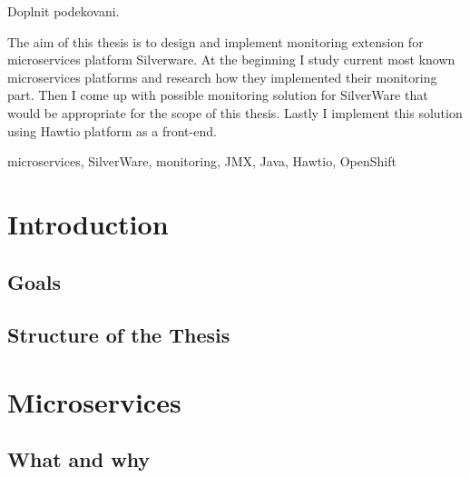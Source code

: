 \documentclass[12pt,oneside]{fithesis2}
\begin{document}
  \FrontMatter                    %
    \ThesisTitlePage                %
    \begin{ThesisDeclaration}       %
      \DeclarationText
      \AdvisorName
    \end{ThesisDeclaration}
    \begin{ThesisThanks}            %
      Doplnit podekovani.
    \end{ThesisThanks}
    \begin{ThesisAbstract}          %
      The aim of this thesis is to design and implement monitoring extension for microservices platform Silverware. At the beginning I study current most known microservices platforms and research how they implemented their monitoring part. Then I come up with possible monitoring solution for SilverWare that would be appropriate for the scope of this thesis. Lastly I implement this solution using Hawtio platform as a front-end.
    \end{ThesisAbstract}
    \begin{ThesisKeyWords}          %
      microservices, SilverWare, monitoring, JMX, Java, Hawtio, OpenShift
    \end{ThesisKeyWords}
    \tableofcontents                %
  
  \MainMatter                     %
\chapter{Introduction}

\section{Goals}

\section{Structure of the Thesis}



\chapter{Microservices}

\section{What and why}
\end{document}
